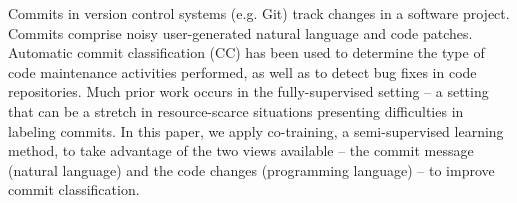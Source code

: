 Commits in version control systems (e.g. Git) track changes in a software project. Commits comprise noisy user-generated natural language and code patches. Automatic commit classification (CC) has been used to determine the type of code maintenance activities performed, as well as to detect bug fixes in code repositories. Much prior work occurs in the fully-supervised setting -- a setting that can be a stretch in resource-scarce situations presenting difficulties in labeling commits. In this paper, we apply co-training, a semi-supervised learning method, to take advantage of the two views available -- the commit message (natural language) and the code changes (programming language) -- to improve commit classification.
